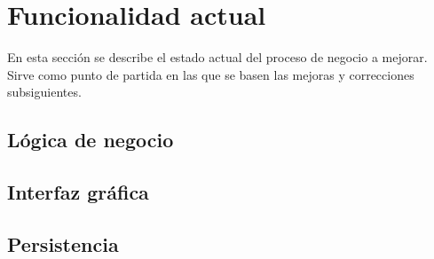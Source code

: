 \newpage
\section{Funcionalidad actual}

\par En esta sección se describe el estado actual del proceso de negocio a mejorar. Sirve como punto de partida en las que se basen las mejoras y correcciones subsiguientes.

\subsection{Lógica de negocio}
\subsection{Interfaz gráfica}

\subsection{Persistencia}
